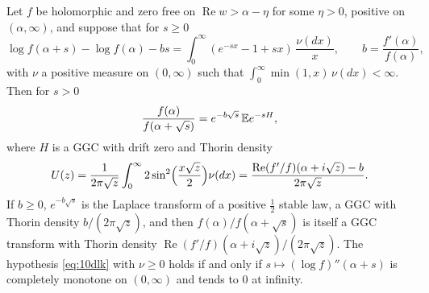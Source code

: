 \begin{lemma}\label{lem:10dsin2}
Let $f$ be holomorphic and zero free on $\operatorname{Re}w>\alpha-\eta$ for some $\eta>0$, positive on $(\alpha,\infty)$, and suppose that for $s\ge0$
\begin{equation}\label{eq:10dlk}
\log f(\alpha+s)-\log f(\alpha)-bs = \int_0^\infty(e^{-sx}-1+sx)\,\frac{\nu(dx)}x,\qquad b = \frac{f'(\alpha)}{f(\alpha)},
\end{equation}
with $\nu$ a positive measure on $(0,\infty)$ such that $\int_0^\infty\min(1,x)\,\nu(dx)<\infty$. Then for $s>0$
\[
\frac{f(\alpha)}{f(\alpha+\sqrt s)} = e^{-b\sqrt s}\,\mathbb{E} e^{-sH},
\]
where $H$ is a GGC with drift zero and Thorin density
\begin{equation}\label{eq:10dU}
U(z) = \frac1{2\pi\sqrt z}\int_0^\infty2\sin^2\Bigl(\frac{x\sqrt z}2\Bigr)\nu(dx) = \frac{\operatorname{Re}(f'/f)(\alpha+i\sqrt z)-b}{2\pi\sqrt z}.
\end{equation}
If $b\ge0$, $e^{-b\sqrt s}$ is the Laplace transform of a positive $\frac12$ stable law, a GGC with Thorin density $b/(2\pi\sqrt z)$, and then $f(\alpha)/f(\alpha+\sqrt s)$ is itself a GGC transform with Thorin density $\operatorname{Re}(f'/f)(\alpha+i\sqrt z)/(2\pi\sqrt z)$. The hypothesis \eqref{eq:10dlk} with $\nu\ge0$ holds if and only if $s\mapsto(\log f)''(\alpha+s)$ is completely monotone on $(0,\infty)$ and tends to $0$ at infinity.
\end{lemma}

